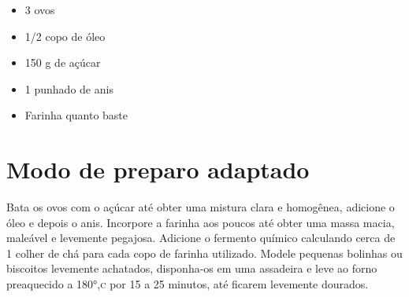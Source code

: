 \begin{itemize}
\item 3 ovos
\item 1/2 copo de óleo
\item 150 g de açúcar
\item 1 punhado de anis
\item Farinha quanto baste
\end{itemize}

\section{Modo de preparo adaptado}

Bata os ovos com o açúcar até obter uma mistura clara e homogênea, adicione o óleo e depois o anis. Incorpore a farinha aos poucos até obter uma massa macia, maleável e levemente pegajosa. Adicione o fermento químico calculando cerca de 1 colher de chá para cada copo de farinha utilizado. Modele pequenas bolinhas ou biscoitos levemente achatados, disponha-os em uma assadeira e leve ao forno preaquecido a 180°,\textsc{c} por 15 a 25 minutos, até ficarem levemente dourados.